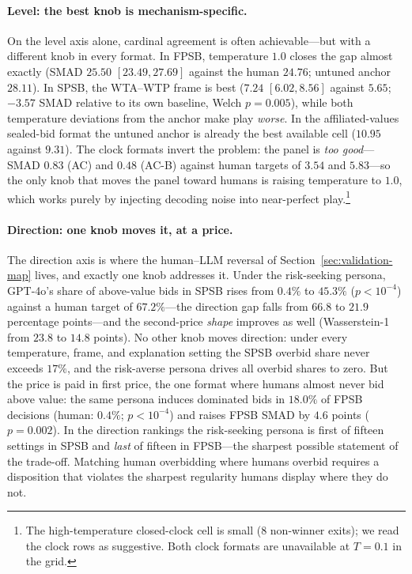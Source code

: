 \paragraph{Level: the best knob is mechanism-specific.}
On the level axis alone, cardinal agreement is often achievable---but with a different knob in every format. In FPSB, temperature $1.0$ closes the gap almost exactly (SMAD $25.50$ $[23.49, 27.69]$ against the human $24.76$; untuned anchor $28.11$). In SPSB, the WTA--WTP frame is best ($7.24$ $[6.02, 8.56]$ against $5.65$; $-3.57$ SMAD relative to its own baseline, Welch $p = 0.005$), while both temperature deviations from the anchor make play \emph{worse}. In the affiliated-values sealed-bid format the untuned anchor is already the best available cell ($10.95$ against $9.31$). The clock formats invert the problem: the panel is \emph{too good}---SMAD $0.83$ (AC) and $0.48$ (AC-B) against human targets of $3.54$ and $5.83$---so the only knob that moves the panel toward humans is raising temperature to $1.0$, which works purely by injecting decoding noise into near-perfect play.\footnote{The high-temperature closed-clock cell is small ($8$ non-winner exits); we read the clock rows as suggestive. Both clock formats are unavailable at $T=0.1$ in the grid.}

\paragraph{Direction: one knob moves it, at a price.}
The direction axis is where the human--LLM reversal of Section~\ref{sec:validation-map} lives, and exactly one knob addresses it. Under the risk-seeking persona, GPT-4o's share of above-value bids in SPSB rises from $0.4\%$ to $45.3\%$ ($p<10^{-4}$) against a human target of $67.2\%$---the direction gap falls from $66.8$ to $21.9$ percentage points---and the second-price \emph{shape} improves as well (Wasserstein-1 from $23.8$ to $14.8$ points). No other knob moves direction: under every temperature, frame, and explanation setting the SPSB overbid share never exceeds $17\%$, and the risk-averse persona drives all overbid shares to zero. But the price is paid in first price, the one format where humans almost never bid above value: the same persona induces dominated bids in $18.0\%$ of FPSB decisions (human: $0.4\%$; $p<10^{-4}$) and raises FPSB SMAD by $4.6$ points ($p = 0.002$). In the direction rankings the risk-seeking persona is first of fifteen settings in SPSB and \emph{last} of fifteen in FPSB---the sharpest possible statement of the trade-off. Matching human overbidding where humans overbid requires a disposition that violates the sharpest regularity humans display where they do not.

